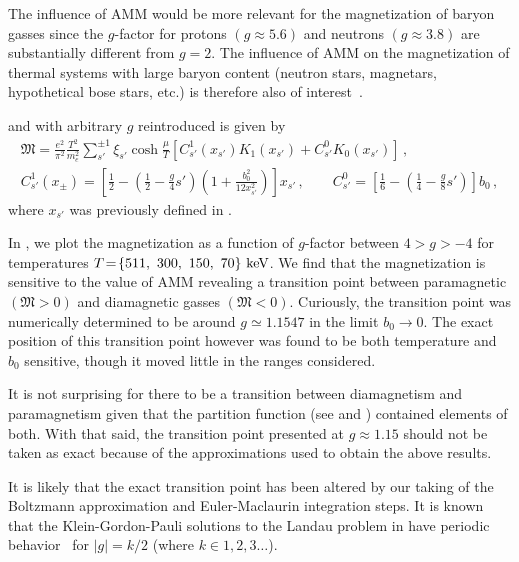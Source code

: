 The influence of AMM would be more relevant for the magnetization of baryon gasses since the $g$-factor for protons $(g\approx5.6)$ and neutrons $(g\approx3.8)$ are substantially different from $g\!=\!2$. The influence of AMM on the magnetization of thermal systems with large baryon content (neutron stars, magnetars, hypothetical bose stars, etc.) is therefore also of interest~\citep{Ferrer:2019xlr,Ferrer:2023pgq}.

 and  with arbitrary $g$ reintroduced is given by
\begin{gather}
\label{arbg:1}
{\mathfrak M}=\frac{e^{2}}{\pi^{2}}\frac{T^{2}}{m_{e}^{2}}\sum_{s'}^{\pm1}\xi_{s'}\cosh{\frac{\mu}{T}}
\left[C^{1}_{s'}(x_{s'})K_{1}(x_{s'})+C^{0}_{s'}K_{0}(x_{s'})\right]\,,\\
\label{arbg:2}
C^{1}_{s'}(x_{\pm}) = \left[\frac{1}{2}-\left(\frac{1}{2}-\frac{g}{4}s'\right)\left(1+\frac{b^2_0}{12x^{2}_{s'}}\right)\right]x_{s'}\,,\qquad
C^{0}_{s'} = \left[\frac{1}{6}-\left(\frac{1}{4}-\frac{g}{8}s'\right)\right]b_0\,,
\end{gather}
where $x_{s'}$ was previously defined in .

In , we plot the magnetization as a function of $g$-factor between $4>g>-4$ for temperatures $T\!=\!\{511,\ 300,\ 150,\ 70\}\keV$. We find that the magnetization is sensitive to the value of AMM revealing a transition point between paramagnetic $({\mathfrak M}>0)$ and diamagnetic gasses $({\mathfrak M}<0)$. Curiously, the transition point was numerically determined to be around $g\simeq1.1547$ in the limit $b_{0}\rightarrow0$. The exact position of this transition point however was found to be both temperature and $b_{0}$ sensitive, though it moved little in the ranges considered.

It is not surprising for there to be a transition between diamagnetism and paramagnetism given that the partition function (see  and ) contained elements of both. With that said, the transition point presented at $g\approx1.15$ should not be taken as exact because of the approximations used to obtain the above results. 

It is likely that the exact transition point has been altered by our taking of the Boltzmann approximation and Euler-Maclaurin integration steps. It is known that the Klein-Gordon-Pauli solutions to the Landau problem in  have periodic behavior~\citep{Steinmetz:2018ryf,Evans:2022fsu,Rafelski:2022bsv} for $|g|=k/2$ (where $k\in1,2,3\ldots$).

